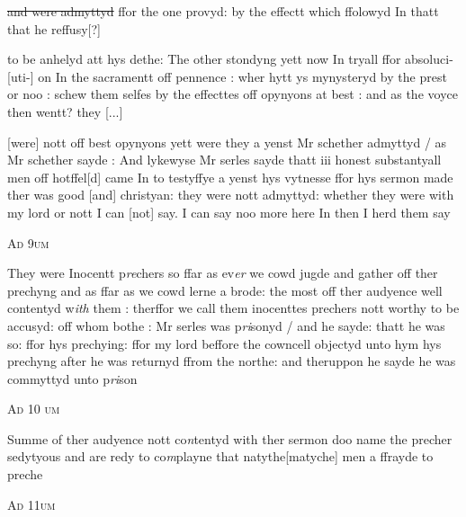 \documentclass[12pt, a4paper]{book}
\begin{document}
                                    \sout{and were admyttyd} ffor the one provyd: by the effectt which ffolowyd In thatt that he reffusy[?]
                                    
 	to be anhelyd att hys dethe: The other stondyng yett now In tryall ffor absoluci-[uti-]
on In the sacramentt off pennence : wher hytt ys mynysteryd by the prest or noo : schew them
selfes by the effecttes off opynyons at best : and as the voyce then wentt? they 
				[...]
			
 	[were]
nott off best opynyons yett were they a yenst Mr schether admyttyd / as Mr schether 
 	sayde : And lykewyse Mr serles sayde thatt iii honest substantyall men off hotffel[d]
 	came In to testyffye a yenst hys vytnesse ffor hys sermon made ther was good [and]
 	christyan: they were nott admyttyd: whether they were with my lord or nott I can [not]
say. I can say noo more here In then I herd them say

				\begin{center} \begin{large} {\scshape Ad 9um} \end{large} \end{center}
			

		\ifthenelse{\isodd{\thepage}}
		{\reversemarginpar}
		{\normalmarginpar}
		They were Inocentt p\textit{re}chers so ffar as ev\textit{er} we cowd jugde and gather off ther prechyng
and as ffar as we cowd lerne a brode: the most off ther audyence well contentyd
w\textit{ith} them : therffor we call them inocenttes prechers nott worthy to be accusyd: off
whom bothe : Mr serles was p\textit{ri}sonyd / and he sayde: thatt he was so: ffor hys
	prechying: ffor my lord beffore the cowncell objectyd unto hym hys prechyng
after he was returnyd ffrom the northe: and theruppon he sayde he was commyttyd
unto p\textit{ri}son

				\begin{center} \begin{large} {\scshape Ad 10 um} \end{large} \end{center}
			

		\ifthenelse{\isodd{\thepage}}
		{\reversemarginpar}
		{\normalmarginpar}
		Summe of ther audyence nott co\textit{n}tentyd with ther sermon doo name the precher sedytyous
 	and are redy to co\textit{m}playne that natythe[matyche] men a ffrayde to preche

				\begin{center} \begin{large} {\scshape Ad 11um} \end{large} \end{center}
			
\end{document}
